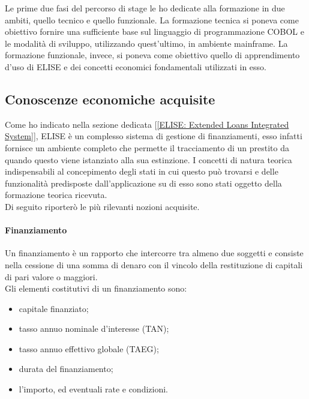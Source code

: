 Le prime due fasi del percorso di stage le ho dedicate alla formazione in due ambiti, quello tecnico e quello funzionale. La formazione tecnica si poneva come obiettivo fornire una sufficiente base sul linguaggio di programmazione COBOL e le modalità di sviluppo, utilizzando quest'ultimo, in ambiente mainframe. La formazione funzionale, invece, si poneva come obiettivo quello di apprendimento d'uso di ELISE e dei concetti economici fondamentali utilizzati in esso.

\subsection{Conoscenze economiche acquisite}
\label{Conoscenze economiche acquisite}

Come ho indicato nella sezione dedicata [\ref{ELISE: Extended Loans Integrated System}], ELISE è un complesso sistema di gestione di finanziamenti, esso infatti fornisce un ambiente completo che permette il tracciamento di un prestito da quando questo viene istanziato alla sua estinzione. I concetti di natura teorica indispensabili al concepimento degli stati in cui questo può trovarsi e delle funzionalità predisposte dall'applicazione su di esso sono stati oggetto della formazione teorica ricevuta.\\

Di seguito riporterò le più rilevanti nozioni acquisite.

\paragraph{Finanziamento}
Un finanziamento è un rapporto che intercorre tra almeno due soggetti e consiste nella cessione di una somma di denaro con il vincolo della restituzione di capitali di pari valore o maggiori.\\
Gli elementi costitutivi di un finanziamento sono:
	\begin{itemize}
		\item capitale finanziato;
		\item tasso annuo nominale d'interesse (TAN);
		\item tasso annuo effettivo globale (TAEG);
		\item durata del finanziamento;
		\item l'importo, ed eventuali rate e condizioni.	
	\end{itemize}

